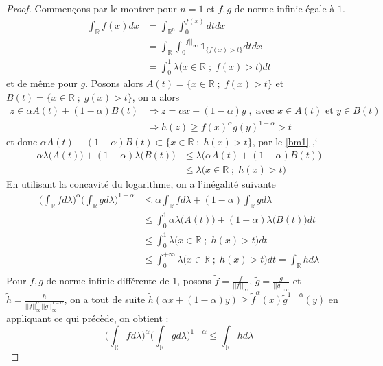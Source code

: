 \documentclass[12pt]{article}
\theoremstyle{definition}
\begin{document}
\begin{proof}
	Commençons par le montrer pour $n=1$ et $f,g$ de norme infinie égale à $1$.
	\begin{align*}
	\int_{\mathbb{R}}f(x) dx &=\int_{\mathbb{R}^n}\int_{0}^{f(x)}dt dx\\
	&=\int_{\mathbb{R}}\int_{0}^{||f||_\infty}\mathbb{1}_{\{f(x)>t\}} dt dx\\
	&=\int_{0}^{1}\lambda\big(x\in\mathbb{R}\;;\;f(x)>t\big)dt
	\end{align*}
	et de même pour $g$. Posons alors $A(t)=\Big\{x\in\mathbb{R}\;;\;f(x)>t\Big\}$ et $B(t)= \Big\{x\in\mathbb{R}\;;\;g(x)>t\Big\}$, on a alors 
	\begin{align*}
	z\in \alpha A(t) + (1-\alpha)B(t) &\Rightarrow z=\alpha x +(1-\alpha)y \; , \; \text{avec $x\in A(t)$ et $y\in B(t)$}\\
	&\Rightarrow h(z)\geq f(x)^{\alpha}g(y)^{1-\alpha}>t
	\end{align*}
	et donc $\alpha A(t) + (1-\alpha)B(t)\subset \Big\{x\in\mathbb{R}\;;\;h(x)>t\Big\}$, par le \cref{bm1} ,`
	\begin{align*}
	\alpha\lambda\big(A(t)\big)+(1-\alpha)\lambda(B(t)\big)&\leq \lambda\Big(\alpha A(t) + (1-\alpha)B(t)\Big)\\
	&\leq \lambda\Big(x\in\mathbb{R}\;;\; h(x)>t\Big)
	\end{align*}
	En utilisant la concavité du logarithme, on a l'inégalité suivante 
	\begin{align*}
	\Big(\int_{\mathbb{R}}fd\lambda\Big)^{\alpha}\Big(\int_{\mathbb{R}}g d\lambda\Big)^{1-\alpha}&\leq \alpha \int_{\mathbb{R}}fd\lambda +(1-\alpha)\int_{\mathbb{R}}g d\lambda\\
	&\leq \int_{0}^{1}\alpha\lambda\big(A(t)\big)+(1-\alpha)\lambda\big(B(t)\big)dt\\
	&\leq \int_{0}^{1}\lambda\Big(x\in\mathbb{R}\;;\; h(x)>t\Big)dt\\
	&\leq \int_{0}^{+\infty}\lambda\Big(x\in\mathbb{R}\;;\; h(x)>t\Big)dt=\int_{\mathbb{R}}hd\lambda\\
	\end{align*}
	Pour $f,g$ de norme infinie différente de 1, posons $\tilde{f}=\frac{f}{||f||_\infty}$, $\tilde{g}=\frac{g}{||g||_\infty}$ et $\tilde{h}=\frac{h}{||f||_\infty^{\alpha}||g||_\infty^{1-\alpha}}$, on a tout de suite $\tilde{h}\left(\alpha x + (1-\alpha)y\right)\geq \tilde{f}^{\alpha}(x)\tilde{g}^{1-\alpha}(y)$ en appliquant ce qui précède, on obtient :
	\begin{equation*}
	\Big(\int_{\mathbb{R}}fd\lambda\Big)^{\alpha}\Big(\int_{\mathbb{R}}g d\lambda\Big)^{1-\alpha}\leq \int_{\mathbb{R}}hd\lambda

\end{equation*}
\end{proof}
\end{document}
